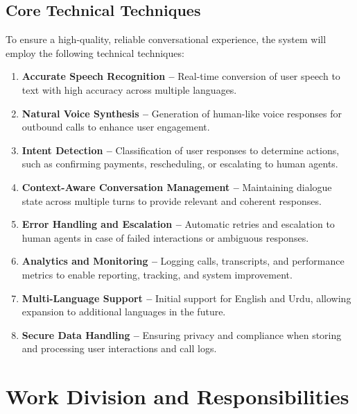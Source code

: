 \documentclass[12pt,a4paper]{report}
\begin{document}
\subsection{Core Technical Techniques}

To ensure a high-quality, reliable conversational experience, the system will employ the following technical techniques:

\begin{enumerate}
    \item \textbf{Accurate Speech Recognition –} Real-time conversion of user speech to text with high accuracy across multiple languages.
    
    \item \textbf{Natural Voice Synthesis –} Generation of human-like voice responses for outbound calls to enhance user engagement.
    
    \item \textbf{Intent Detection –} Classification of user responses to determine actions, such as confirming payments, rescheduling, or escalating to human agents.
    
    \item \textbf{Context-Aware Conversation Management –} Maintaining dialogue state across multiple turns to provide relevant and coherent responses.
    
    \item \textbf{Error Handling and Escalation –} Automatic retries and escalation to human agents in case of failed interactions or ambiguous responses.
    
    \item \textbf{Analytics and Monitoring –} Logging calls, transcripts, and performance metrics to enable reporting, tracking, and system improvement.
    
    \item \textbf{Multi-Language Support –} Initial support for English and Urdu, allowing expansion to additional languages in the future.
    
    \item \textbf{Secure Data Handling –} Ensuring privacy and compliance when storing and processing user interactions and call logs.
\end{enumerate}

\section{Work Division and Responsibilities}
\end{document}
